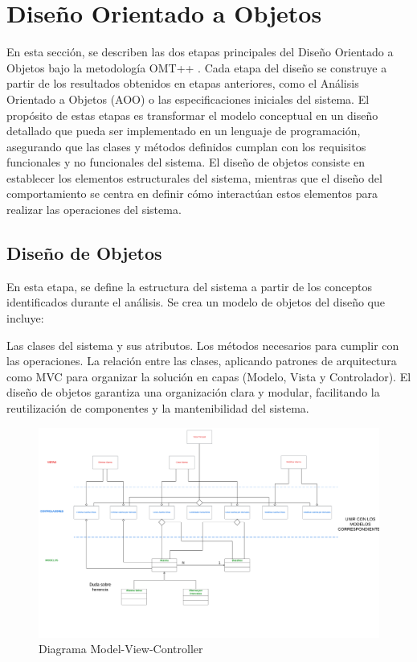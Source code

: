 \section{Diseño Orientado a Objetos}
En esta sección, se describen las dos etapas principales del Diseño Orientado a Objetos bajo la metodología OMT++ . Cada etapa del diseño se construye a partir de los resultados obtenidos en etapas anteriores, como el Análisis Orientado a Objetos (AOO) o las especificaciones iniciales del sistema. El propósito de estas etapas es transformar el modelo conceptual en un diseño detallado que pueda ser implementado en un lenguaje de programación, asegurando que las clases y métodos definidos cumplan con los requisitos funcionales y no funcionales del sistema.
El diseño de objetos consiste en establecer los elementos estructurales del sistema, mientras que el diseño del comportamiento se centra en definir cómo interactúan estos elementos para realizar las operaciones del sistema.

 \subsection{Diseño de Objetos}
 En esta etapa, se define la estructura del sistema a partir de los conceptos identificados durante el análisis. Se crea un modelo de objetos del diseño que incluye:

 Las clases del sistema y sus atributos.
 Los métodos necesarios para cumplir con las operaciones.
 La relación entre las clases, aplicando patrones de arquitectura como MVC para organizar la solución en capas (Modelo, Vista y Controlador).
 El diseño de objetos garantiza una organización clara y modular, facilitando la reutilización de componentes y la mantenibilidad del sistema.

 \begin{figure}[H]
	\centering
	\includegraphics[width=\textwidth]{./img/mvc.png}
	\caption{Diagrama Model-View-Controller}
        \vspace{10pt}
	\label{fig:Diagrama Model-View-Controller}
\end{figure}

